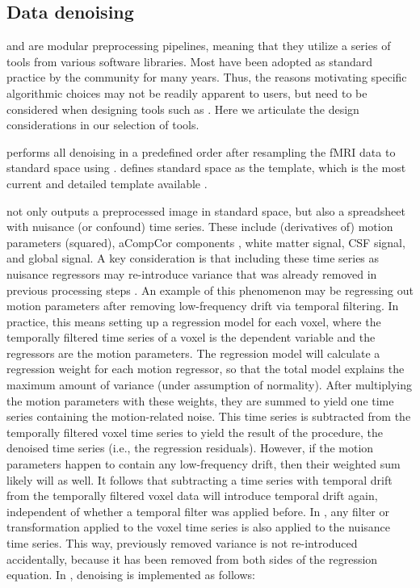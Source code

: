 \subsection{Data denoising}\label{sec:denoising}

 and  are modular preprocessing pipelines,
meaning that they utilize a series of tools from various software
libraries. Most have been adopted as standard practice by the community for
many years. Thus, the reasons motivating specific algorithmic choices may
not be readily apparent to users, but need to be considered when designing
tools such as . Here we articulate the design considerations
in our selection of tools.

 performs all denoising in a predefined order after
resampling the fMRI data to standard space using .
 defines standard space as the 
template, which is the most current and detailed template available
\parencite{horn_blog}.

 not only outputs a preprocessed image in standard space,
but also a spreadsheet with nuisance (or confound) time series. These
include (derivatives of) motion parameters (squared), aCompCor components
\parencite{10.1016/j.neuroimage.2007.04.042}, white matter signal, CSF signal,
and global signal. A key consideration is that including these time series
as nuisance regressors may re-introduce variance that was already removed
in previous processing steps \parencite{10.1016/j.neuroimage.2013.05.116}. An
example of this phenomenon may be regressing out motion parameters after
removing low-frequency drift via temporal filtering. In practice, this
means setting up a regression model for each voxel, where the temporally
filtered time series of a voxel is the dependent variable and the
regressors are the motion parameters. The regression model will calculate a
regression weight for each motion regressor, so that the total model
explains the maximum amount of variance (under assumption of normality).
After multiplying the motion parameters with these weights, they are summed
to yield one time series containing the motion-related noise. This time
series is subtracted from the temporally filtered voxel time series to
yield the result of the procedure, the denoised time series (i.e., the
regression residuals). However, if the motion parameters happen to contain
any low-frequency drift, then their weighted sum likely will as well. It
follows that subtracting a time series with temporal drift from the
temporally filtered voxel data will introduce temporal drift again,
independent of whether a temporal filter was applied before. In
, any filter or transformation applied to the voxel time
series is also applied to the nuisance time series. This way, previously
removed variance is not re-introduced accidentally, because it has been
removed from both sides of the regression equation. In ,
denoising is implemented as follows:


